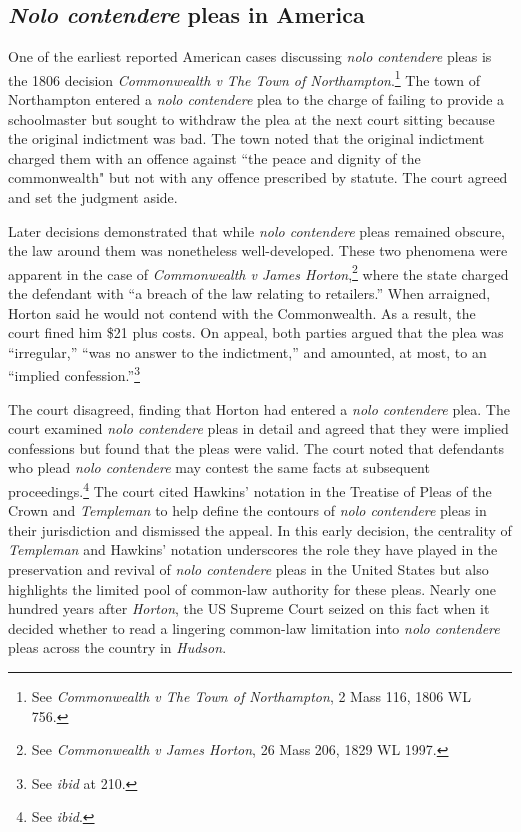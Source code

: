 \subsection{\textit{Nolo contendere} pleas in America}

One of the earliest reported American cases discussing \textit{nolo contendere} pleas is the 1806 decision \textit{Commonwealth v The Town of Northampton}.\footnote{See \textit{Commonwealth v The Town of Northampton}, 2 Mass 116, 1806 WL 756.} The town of Northampton entered a \textit{nolo contendere} plea to the charge of failing to provide a schoolmaster but sought to withdraw the plea at the next court sitting because the original indictment was bad. The town noted that the original indictment charged them with an offence against ``the peace and dignity of the commonwealth" but not with any offence prescribed by statute. The court agreed and set the judgment aside.

Later decisions demonstrated that while \textit{nolo contendere} pleas remained obscure, the law around them was nonetheless well-developed. These two phenomena were apparent in the case of \textit{Commonwealth v James Horton},\footnote{See \textit{Commonwealth v James Horton}, 26 Mass 206, 1829 WL 1997.} where the state charged the defendant with ``a breach of the law relating to retailers.'' When arraigned, Horton said he would not contend with the Commonwealth. As a result, the court fined him \$21 plus costs. On appeal, both parties argued that the plea was ``irregular,'' ``was no answer to the indictment,'' and amounted, at most, to an ``implied confession.''\footnote{See \textit{ibid} at 210.} 

The court disagreed, finding that Horton had entered a \textit{nolo contendere} plea. The court examined \textit{nolo contendere} pleas in detail and agreed that they were implied confessions but found that the pleas were valid. The court noted that defendants who plead \textit{nolo contendere} may contest the same facts at subsequent proceedings.\footnote{See \textit{ibid}.} The court cited Hawkins' notation in the Treatise of Pleas of the Crown and \textit{Templeman} to help define the contours of \textit{nolo contendere} pleas in their jurisdiction and dismissed the appeal. In this early decision, the centrality of \textit{Templeman} and Hawkins' notation underscores the role they have played in the preservation and revival of \textit{nolo contendere} pleas in the United States but also highlights the limited pool of common-law authority for these pleas. Nearly one hundred years after \textit{Horton}, the US Supreme Court seized on this fact when it decided whether to read a lingering common-law limitation into \textit{nolo contendere} pleas across the country in \textit{Hudson}.

